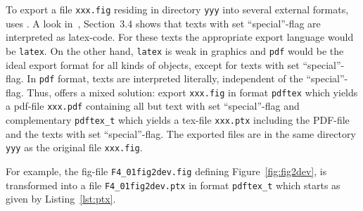 To export a file \texttt{xxx.fig} residing in directory \texttt{yyy} 
into several external formats, 
 uses . 
A look in~\cite{XFigF}, Section~3.4 shows that texts with set ``special''-flag 
are interpreted as latex-code. 
For these texts the appropriate export language would be \texttt{latex}. 
On the other hand, \texttt{latex} is weak in graphics 
and \texttt{pdf} would be the ideal export format for all kinds of objects, 
except for texts with set ``special''-flag. 
In \texttt{pdf} format, texts are interpreted literally, 
independent of the ``special''-flag. 
Thus,  offers a mixed solution: 
export \texttt{xxx.fig} in format \texttt{pdftex} which yields a pdf-file 
\texttt{xxx.pdf} containing all but text with set ``special''-flag 
and complementary \texttt{pdftex\_t} which yields a tex-file \texttt{xxx.ptx} 
including the PDF-file and the texts with set ``special''-flag. %
The exported files are in the same directory \texttt{yyy} 
as the original file \texttt{xxx.fig}. 

For example, 
the fig-file \texttt{F4\_01fig2dev.fig} defining Figure~\ref{fig:fig2dev}, 
is transformed into a file \texttt{F4\_01fig2dev.ptx} 
in format \texttt{pdftex\_t} which starts as given by Listing~\ref{lst:ptx}. 



